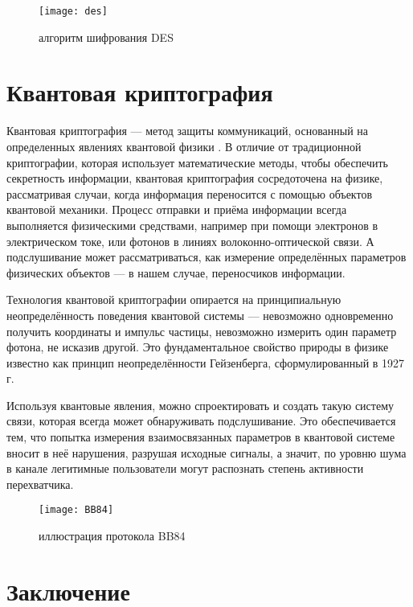 \begin{figure}[H]
	\texttt{[image: des]}
	\centering
	\caption{алгоритм шифрования DES}
\end{figure}


\section{Квантовая криптография}

Квантовая криптография — метод защиты коммуникаций, основанный на определенных явлениях квантовой физики \cite{ch1984quantum, lo2005decoy}. В отличие от традиционной криптографии, которая использует математические методы, чтобы обеспечить секретность информации, квантовая криптография сосредоточена на физике, рассматривая случаи, когда информация переносится с помощью объектов квантовой механики. Процесс отправки и приёма информации всегда выполняется физическими средствами, например при помощи электронов в электрическом токе, или фотонов в линиях волоконно-оптической связи. А подслушивание может рассматриваться, как измерение определённых параметров физических объектов — в нашем случае, переносчиков информации.

Технология квантовой криптографии опирается на принципиальную неопределённость поведения квантовой системы — невозможно одновременно получить координаты и импульс частицы, невозможно измерить один параметр фотона, не исказив другой. Это фундаментальное свойство природы в физике известно как принцип неопределённости Гейзенберга, сформулированный в 1927 г.

Используя квантовые явления, можно спроектировать и создать такую систему связи, которая всегда может обнаруживать подслушивание. Это обеспечивается тем, что попытка измерения взаимосвязанных параметров в квантовой системе вносит в неё нарушения, разрушая исходные сигналы, а значит, по уровню шума в канале легитимные пользователи могут распознать степень активности перехватчика.

\begin{figure}[H]
	\texttt{[image: BB84]}
	\centering
	\caption{иллюстрация протокола BB84}
\end{figure}

\clearpage

\section*{Заключение}

